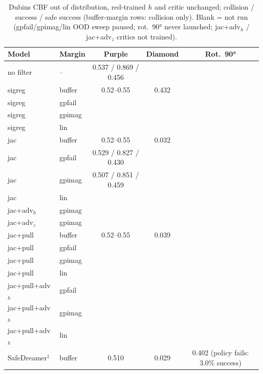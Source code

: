 \documentclass{article}
\begin{document}
\begin{table}[t]\centering\small
\caption{Dubins CBF out of distribution, red-trained $h$ and critic unchanged; collision / success / safe success (buffer-margin rows: collision only). Blank = not run (gpfail/gpimag/lin OOD sweep paused; rot.\ 90° never launched; jac+adv$_h$ / jac+adv$_z$ critics not trained).}
\label{tab:cbf_ood}
\begin{tabular}{llccc}
\toprule
Model & Margin & Purple & Diamond & Rot.\ 90° \\
\midrule
no filter & -- & 0.537 / 0.869 / 0.456 &  &  \\
sigreg & buffer & 0.52--0.55 & 0.432 &  \\
sigreg & gpfail &  &  &  \\
sigreg & gpimag &  &  &  \\
sigreg & lin &  &  &  \\
jac & buffer & 0.52--0.55 & 0.032 &  \\
jac & gpfail & 0.529 / 0.827 / 0.430 &  &  \\
jac & gpimag & 0.507 / 0.851 / 0.459 &  &  \\
jac & lin &  &  &  \\
jac+adv$_h$ & gpimag &  &  &  \\
jac+adv$_z$ & gpimag &  &  &  \\
\midrule
jac+pull & buffer & 0.52--0.55 & 0.039 &  \\
jac+pull & gpfail &  &  &  \\
jac+pull & gpimag &  &  &  \\
jac+pull & lin &  &  &  \\
jac+pull+adv$_h$ & gpfail &  &  &  \\
jac+pull+adv$_h$ & gpimag &  &  &  \\
jac+pull+adv$_h$ & lin &  &  &  \\
\midrule
SafeDreamer$^\ddagger$ & buffer & 0.510 & 0.029 & 0.402 (policy fails: 3.0\% success) \\
\bottomrule
\end{tabular}
\end{table}
\end{document}
